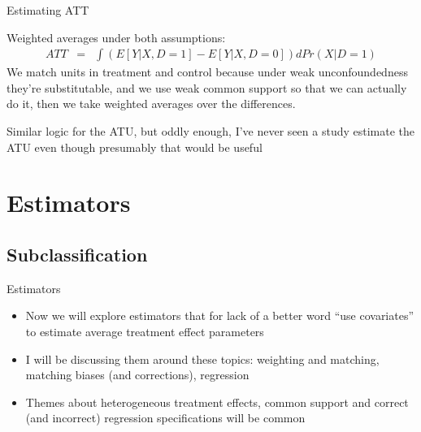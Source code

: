 \documentclass{beamer}
\begin{document}
\begin{frame}{Estimating ATT}


Weighted averages under both assumptions:
		\begin{eqnarray*}
		{ATT} &=& \int \left(E[Y|X,D=1] - E[Y|X,D=0]\right)dPr(X|D=1)
		\end{eqnarray*}
We match units in treatment and control because under weak unconfoundedness they're substitutable, and we use weak common support so that we can actually do it, then we take weighted averages over the differences.  

\bigskip

Similar logic for the ATU, but oddly enough, I've never seen a study estimate the ATU even though presumably that would be useful
		
\end{frame}





\section{Estimators}


\subsection{Subclassification}

\begin{frame}{Estimators}

\begin{itemize}

\item Now we will explore estimators that for lack of a better word ``use covariates'' to estimate average treatment effect parameters
\item I will be discussing them around these topics: weighting and matching, matching biases (and corrections), regression
\item Themes about heterogeneous treatment effects, common support and correct (and incorrect) regression specifications will be common

\end{itemize}

\end{frame}
\end{document}

